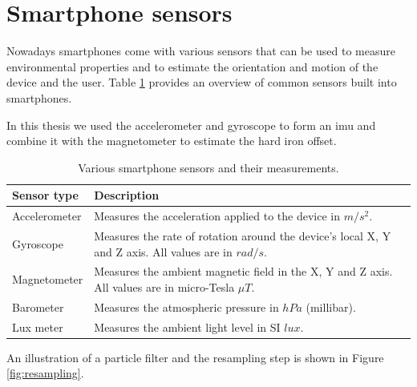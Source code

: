 
\section{Smartphone sensors}


Nowadays smartphones come with various sensors that can be used to measure environmental properties and to estimate the orientation and motion of the device and the user. Table \ref{tbl:sensors} provides an overview of common sensors built into smartphones.

In this thesis we used the accelerometer and gyroscope to form an \gls{imu} and combine it with the magnetometer to estimate the hard iron offset.

\begin{table}[h]
    \centering
    \begin{tabular}{ | l | p{10cm} | }
    \hline
    \textbf{Sensor type} & \textbf{Description} \\ \hline
    Accelerometer        & Measures the acceleration applied to the device in $m/s^2$. \\ \hline
    Gyroscope            & Measures the rate of rotation around the device's local X, Y and Z axis. All values are in $rad/s$. \\ \hline
    Magnetometer         & Measures the ambient magnetic field in the X, Y and Z axis. All values are in micro-Tesla $\mu T$. \\ \hline
    Barometer            & Measures the atmospheric pressure in $hPa$ (millibar). \\ \hline
    Lux meter            & Measures the ambient light level in SI $lux$. \\ \hline
    \end{tabular}
    \caption{Various smartphone sensors and their measurements.}
    \label{tbl:sensors}
\end{table}


An illustration of a particle filter and the resampling step is shown in Figure \ref{fig:resampling}.

